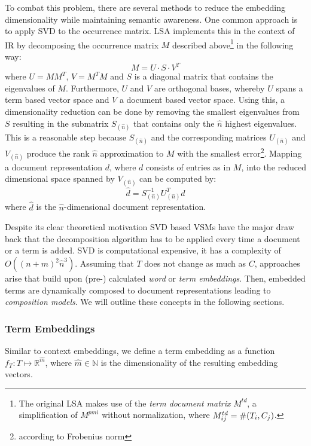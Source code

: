 To combat this problem, there are several methods to reduce the embedding dimensionality while maintaining semantic awareness. One common approach is to apply \ac{SVD} to the occurrence matrix. \ac{LSA} \autocite{deerwester_indexing_1990} implements this in the context of \ac{IR} by decomposing the occurrence matrix $M$ described above\footnote{The original \ac{LSA} makes use of the \textit{term document matrix} $M^{td}$, a simplification of $M^{pmi}$ without normalization, where $M^{td}_{ij} =\nobreak \#(T_i, C_j)$.} in the following way:
\begin{equation}
M = U \cdot S \cdot V^T
\end{equation}
where $U = MM^T$, $V = M^TM$ and $S$ is a diagonal matrix that contains the eigenvalues of $M$. Furthermore, $U$ and $V$ are orthogonal bases, whereby $U$ spans a term based vector space and $V$ a document based vector space. Using this, a dimensionality reduction can be done by removing the smallest eigenvalues from $S$ resulting in the submatrix $S_{(\hat{n})}$ that contains only the $\hat{n}$ highest eigenvalues. This is a reasonable step because $S_{(\hat{n})}$ and the corresponding matrices $U_{(\hat{n})}$ and $V_{(\hat{n})}$ produce the rank $\hat{n}$ approximation to $M$ with the smallest error\footnote{according to Frobenius norm}. Mapping a document representation $d$, where $d$ consists of entries as in $M$, into the reduced dimensional space spanned by $V_{(\hat{n})}$ can be computed by: 
\begin{equation} \label{eq:svd_doc}
\hat{d} = S_{(\hat{n})}^{-1}U_{(\hat{n})}^Td
\end{equation}
where $\hat{d}$ is the $\hat{n}$-dimensional document representation. 

Despite its clear theoretical motivation SVD based VSMs have the major draw back that the decomposition algorithm has to be applied every time a document or a term is added. \ac{SVD} is computational expensive, it has a complexity of $O((n+m)^2\hat{n}^3)$. Assuming that $T$ does not change as much as $C$, approaches arise that build upon (pre-) calculated \textit{word} or \textit{term embeddings}. Then, embedded terms are dynamically composed to document representations leading to \textit{composition models}. We will outline these concepts in the following sections.

\subsubsection{Term Embeddings}
Similar to context embeddings, we define a term embedding as a function $f_T:T \mapsto \mathbb{R}^{\hat{m}}$, where $\hat{m} \in \mathbb{N}$ is the dimensionality of the resulting embedding vectors.


